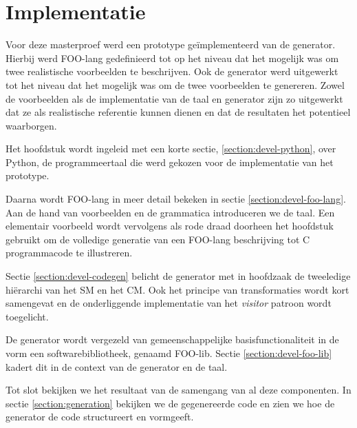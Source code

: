 
\chapter{Implementatie}
\label{chapter:implementatie}

Voor deze masterproef werd een prototype ge\"implementeerd van de generator. Hierbij
werd FOO-lang gedefinieerd tot op het niveau dat het mogelijk was om twee
realistische voorbeelden te beschrijven. Ook de generator werd uitgewerkt tot
het niveau dat het mogelijk was om de twee voorbeelden te genereren. Zowel de
voorbeelden als de implementatie van de taal en generator zijn zo uitgewerkt
dat ze als realistische referentie kunnen dienen en dat de resultaten het
potentieel waarborgen.

Het hoofdstuk wordt ingeleid met een korte sectie, \ref{section:devel-python},
over Python, de programmeertaal die werd gekozen voor de implementatie van het
prototype.

Daarna wordt FOO-lang in meer detail bekeken in sectie
\ref{section:devel-foo-lang}. Aan de hand van voorbeelden en de grammatica
introduceren we de taal. Een elementair voorbeeld wordt vervolgens als rode
draad doorheen het hoofdstuk gebruikt om de volledige generatie van een
FOO-lang beschrijving tot C programmacode te illustreren.

Sectie \ref{section:devel-codegen} belicht de generator met in hoofdzaak de
tweeledige hi\"erarchi van het SM en het CM. Ook het principe van
transformaties wordt kort samengevat en de onderliggende implementatie van het
\emph{visitor} patroon \citep{gamma1994design} wordt toegelicht.

De generator wordt vergezeld van gemeenschappelijke basisfunctionaliteit in de
vorm een softwarebibliotheek, genaamd FOO-lib. Sectie
\ref{section:devel-foo-lib} kadert dit in de context van de generator en de
taal.

Tot slot bekijken we het resultaat van de samengang van al deze componenten. In
sectie \ref{section:generation} bekijken we de gegenereerde code en zien we hoe
de generator de code structureert en vormgeeft.






